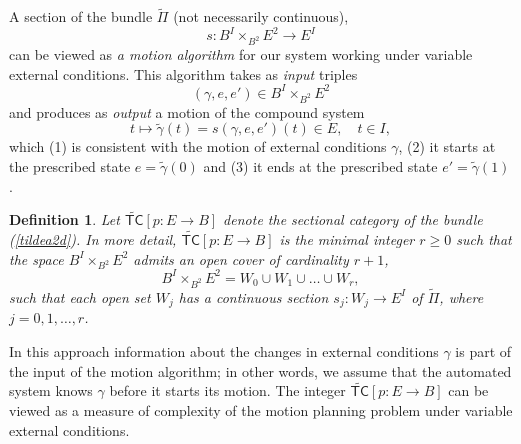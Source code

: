 \documentclass[11pt]{amsart}
\newtheorem{definition}[theorem]{Definition}
\def\tc{{\mathsf{TC}}}
\begin{document}
A section of the bundle $\tilde \Pi$  (not necessarily continuous),
$$s: B^I\times_{B^2} E^2 \to E^I$$  can be viewed as {\it a motion algorithm} for our system working under variable external conditions. 
This algorithm takes as {\it input} triples $$(\gamma, e, e')\in B^I\times_{B^2} E^2$$ and produces as {\it  output} a motion of the compound system 
$$t\mapsto \tilde \gamma(t)= s(\gamma, e, e')(t)\in E, \quad t\in I,$$ which (1) is consistent with the motion of external conditions $\gamma$, (2) it starts at the prescribed state $e=\tilde\gamma(0)$ and (3) it ends at 
the prescribed state $e'=\tilde\gamma(1)$. 


\begin{definition}
Let $\widetilde\tc[p:E\to B]$ denote the sectional category of the bundle (\ref{tildea2d}). In more detail, $\widetilde\tc[p:E\to B]$ is the minimal integer $r\ge 0$ such that the space 
$B^I\times_{B^2}E^2$ admits an open cover of cardinality $r+1$, 
$$
B^I\times_{B^2}E^2= W_0\cup W_1\cup \dots\cup W_r,
$$
such that each open set $W_j$ has a continuous section $s_j: W_j\to E^I$ of $\tilde \Pi$, 
where $j=0, 1, \dots, r$.
\end{definition}

In this approach information about the changes in external conditions $\gamma$ is part of the input of the motion algorithm; in other words, we assume that the automated system knows 
$\gamma$ before it starts its motion. 
The integer $\widetilde\tc[p:E\to B]$ can be viewed as a measure of complexity of the motion planning problem under variable external conditions. 
\end{document}
